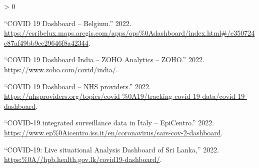 \documentclass[
]{article}
\newlength{\cslhangindent}
\newenvironment{CSLReferences}[2] %
 {%
  \setlength{\parindent}{0pt}
  \ifodd #1 \everypar{\setlength{\hangindent}{\cslhangindent}}\ignorespaces\fi
  \ifnum #2 > 0
  \setlength{\parskip}{#2\baselineskip}
  \fi
 }%
 {}
\begin{document}
\hypertarget{refs}{}
\begin{CSLReferences}{1}{0}
\leavevmode\hypertarget{ref-belgium}{}%
{``{COVID 19 Dashboard -- Belgium}.''} 2022.
\url{https://esribelux.maps.arcgis.com/apps/ops\%0Adashboard/index.html\#/e350724c87af49bb9ce29646f8a42344}.

\leavevmode\hypertarget{ref-indiadash}{}%
{``{COVID 19 Dashboard India -- ZOHO Analytics -- ZOHO}.''} 2022.
\url{https://www.zoho.com/covid/india/}.

\leavevmode\hypertarget{ref-nhs}{}%
{``{COVID 19 Dashboard -- NHS providers}.''} 2022.
\url{https://nhsproviders.org/topics/covid-\%0A19/tracking-covid-19-data/covid-19-dashboard}.

\leavevmode\hypertarget{ref-italy}{}%
{``{COVID-19 integrated surveillance data in Italy -- EpiCentro}.''}
2022.
\url{https://www.ep\%0Aicentro.iss.it/en/coronavirus/sars-cov-2-dashboard}.

\leavevmode\hypertarget{ref-sl}{}%
{``{COVID-19: Live situational Analysis Dashboard of Sri Lanka,}''}
2022. \url{https:\%0A//hpb.health.gov.lk/covid19-dashboard/}.

\end{CSLReferences}
\end{document}
